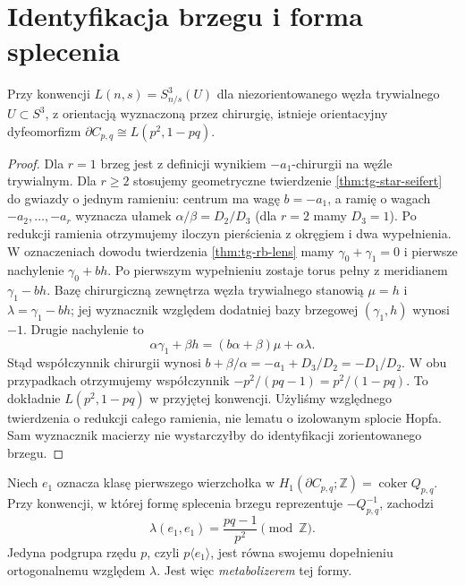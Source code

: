 \section{Identyfikacja brzegu i forma splecenia}
\label{sec:tg-general-boundary}

\begin{twierdzenie}
\label{thm:tg-general-lens}
Przy konwencji $L(n,s)=S^3_{n/s}(U)$ dla
niezorientowanego węzła trywialnego $U\subset S^3$,
z orientacją wyznaczoną przez chirurgię, istnieje
orientacyjny dyfeomorfizm
$\partial C_{p,q}\cong L(p^2,1-pq)$.
\end{twierdzenie}

\begin{proof}
Dla $r=1$ brzeg jest z definicji wynikiem
$-a_1$-chirurgii na węźle trywialnym.
Dla $r\geq2$ stosujemy geometryczne twierdzenie
\ref{thm:tg-star-seifert} do gwiazdy o jednym
ramieniu: centrum ma wagę $b=-a_1$, a ramię
o wagach $-a_2,\ldots,-a_r$ wyznacza ułamek
$\alpha/\beta=D_2/D_3$ (dla $r=2$ mamy $D_3=1$).
Po redukcji ramienia otrzymujemy iloczyn
pierścienia z okręgiem i dwa wypełnienia.
W oznaczeniach dowodu twierdzenia \ref{thm:tg-rb-lens}
mamy $\gamma_0+\gamma_1=0$ i pierwsze
nachylenie $\gamma_0+bh$.
Po pierwszym wypełnieniu zostaje torus pełny
z meridianem $\gamma_1-bh$. Bazę chirurgiczną
zewnętrza węzła trywialnego stanowią
$\mu=h$ i $\lambda=\gamma_1-bh$;
jej wyznacznik względem dodatniej bazy
brzegowej $(\gamma_1,h)$ wynosi $-1$.
Drugie nachylenie to
\[
\alpha\gamma_1+\beta h
=(b\alpha+\beta)\mu+\alpha\lambda.
\]
Stąd współczynnik chirurgii wynosi
$b+\beta/\alpha=-a_1+D_3/D_2=-D_1/D_2$.
W obu przypadkach otrzymujemy współczynnik
$-p^2/(pq-1)=p^2/(1-pq)$.
To dokładnie $L(p^2,1-pq)$ w przyjętej
konwencji. Użyliśmy względnego twierdzenia
o redukcji całego ramienia, nie lematu
o izolowanym splocie Hopfa. Sam wyznacznik
macierzy nie wystarczyłby do identyfikacji
zorientowanego brzegu.
\end{proof}

\begin{stwierdzenie}
\label{prop:tg-general-linking}
Niech $e_1$ oznacza klasę pierwszego wierzchołka w
$H_1(\partial C_{p,q};\mathbb Z)=\operatorname{coker}Q_{p,q}$.
Przy konwencji, w której formę splecenia brzegu reprezentuje
$-Q_{p,q}^{-1}$, zachodzi
\[
\lambda(e_1,e_1)=\frac{pq-1}{p^2}\pmod{\mathbb Z}.
\]
Jedyna podgrupa rzędu $p$, czyli $p\langle e_1\rangle$,
jest równa swojemu dopełnieniu ortogonalnemu względem
$\lambda$. Jest więc \emph{metabolizerem} tej formy.
\end{stwierdzenie}

